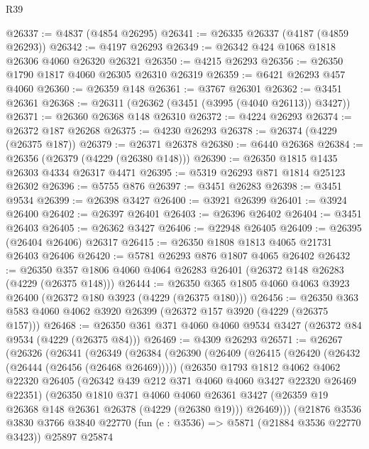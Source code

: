 \begin{lexlean}{R39}
\begin{coremodule}
@26337 := @4837 (@4854 @26295)
@26341 := @26335 @26337 (@4187 (@4859 @26293))
@26342 := @4197 @26293
@26349 := @26342 @424 @1068 @1818 @26306 @4060 @26320 @26321
@26350 := @4215 @26293
@26356 := @26350 @1790 @1817 @4060 @26305 @26310 @26319
@26359 := @6421 @26293 @457 @4060
@26360 := @26359 @148
@26361 := @3767 @26301
@26362 := @3451 @26361
@26368 := @26311 (@26362 (@3451 (@3995 (@4040 @26113)) @3427))
@26371 := @26360 @26368 @148 @26310
@26372 := @4224 @26293
@26374 := @26372 @187 @26268
@26375 := @4230 @26293
@26378 := @26374 (@4229 (@26375 @187))
@26379 := @26371 @26378
@26380 := @6440 @26368
@26384 := @26356 (@26379 (@4229 (@26380 @148)))
@26390 := @26350 @1815 @1435 @26303 @4334 @26317 @4471
@26395 := @5319 @26293 @871 @1814 @25123 @26302
@26396 := @5755 @876
@26397 := @3451 @26283
@26398 := @3451 @9534
@26399 := @26398 @3427
@26400 := @3921 @26399
@26401 := @3924 @26400
@26402 := @26397 @26401
@26403 := @26396 @26402
@26404 := @3451 @26403
@26405 := @26362 @3427
@26406 := @22948 @26405
@26409 := @26395 (@26404 @26406) @26317
@26415 := @26350 @1808 @1813 @4065 @21731 @26403 @26406
@26420 := @5781 @26293 @876 @1807 @4065 @26402
@26432 := @26350 @357 @1806 @4060 @4064 @26283 @26401 (@26372 @148 @26283 (@4229 (@26375 @148)))
@26444 := @26350 @365 @1805 @4060 @4063 @3923 @26400 (@26372 @180 @3923 (@4229 (@26375 @180)))
@26456 := @26350 @363 @583 @4060 @4062 @3920 @26399 (@26372 @157 @3920 (@4229 (@26375 @157)))
@26468 := @26350 @361 @371 @4060 @4060 @9534 @3427 (@26372 @84 @9534 (@4229 (@26375 @84)))
@26469 := @4309 @26293
@26571 := @26267
    (@26326
      (@26341
        (@26349
          (@26384
            (@26390
              (@26409
                (@26415
                  (@26420 (@26432 (@26444 (@26456 (@26468 @26469)))))
                  (@26350
                    @1793
                    @1812
                    @4062
                    @4062
                    @22320
                    @26405
                    (@26342 @439 @212 @371 @4060 @4060 @3427 @22320 @26469 @22351)
                    (@26350
                      @1810
                      @371
                      @4060
                      @4060
                      @26361
                      @3427
                      (@26359 @19 @26368 @148 @26361 @26378 (@4229 (@26380 @19)))
                      @26469)))
                (@21876
                  @3536
                  @3830
                  @3766
                  @3840
                  @22770
                  (fun (e : @3536) => @5871 (@21884 @3536 @22770 @3423))
                  @25897
                  @25874

\end{coremodule}
\end{lexlean}
